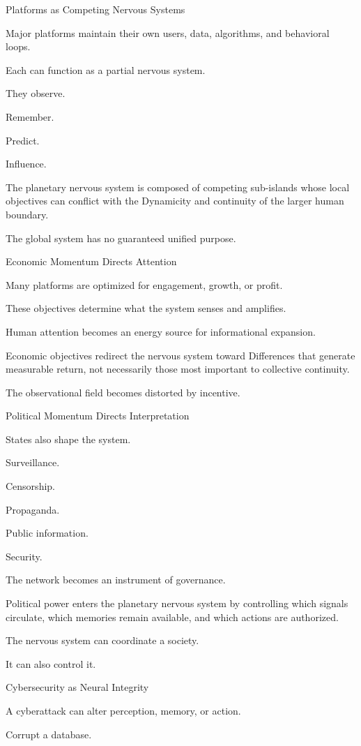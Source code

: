 Platforms as Competing Nervous Systems

Major platforms maintain their own users, data, algorithms, and behavioral loops.

Each can function as a partial nervous system.

They observe.

Remember.

Predict.

Influence.

The planetary nervous system is composed of competing sub-islands whose local objectives can conflict with the Dynamicity and continuity of the larger human boundary.

The global system has no guaranteed unified purpose.

Economic Momentum Directs Attention

Many platforms are optimized for engagement, growth, or profit.

These objectives determine what the system senses and amplifies.

Human attention becomes an energy source for informational expansion.

Economic objectives redirect the nervous system toward Differences that generate measurable return, not necessarily those most important to collective continuity.

The observational field becomes distorted by incentive.

Political Momentum Directs Interpretation

States also shape the system.

Surveillance.

Censorship.

Propaganda.

Public information.

Security.

The network becomes an instrument of governance.

Political power enters the planetary nervous system by controlling which signals circulate, which memories remain available, and which actions are authorized.

The nervous system can coordinate a society.

It can also control it.

Cybersecurity as Neural Integrity

A cyberattack can alter perception, memory, or action.

Corrupt a database.

